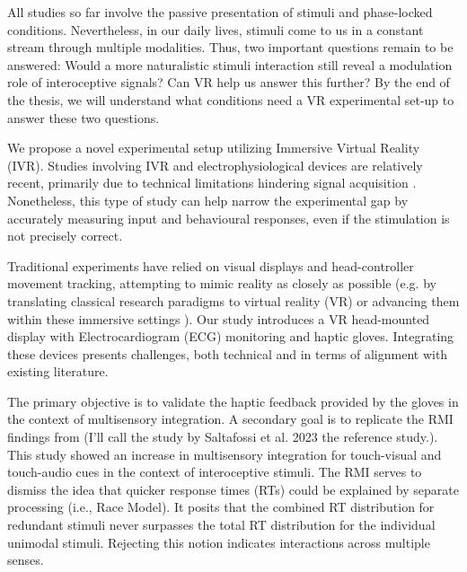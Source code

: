 \documentclass[12pt,oneside,openright]{report}
\begin{document}
All studies so far involve the passive presentation of stimuli and phase-locked conditions. Nevertheless, in our daily lives, stimuli come to us in a constant stream through multiple modalities. Thus, two important questions remain to be answered: Would a more naturalistic stimuli interaction still reveal a modulation role of interoceptive signals? Can VR help us answer this further? By the end of the thesis, we will understand what conditions need a VR experimental set-up to answer these two questions. 




We propose a novel experimental setup utilizing Immersive Virtual Reality (IVR). Studies involving IVR and electrophysiological devices are relatively recent, primarily due to technical limitations hindering signal acquisition \parencite{Klotzsche2023,Kisker2024InducedOB}. Nonetheless, this type of study can help narrow the experimental gap by accurately measuring input and behavioural responses, even if the stimulation is not precisely correct.

Traditional experiments have relied on visual displays and head-controller movement tracking, attempting to mimic reality as closely as possible (e.g. by translating classical research paradigms to virtual reality (VR) or advancing them within these immersive settings \parencite{Kisker2024InducedOB}). Our study introduces a VR head-mounted display with Electrocardiogram (ECG) monitoring and haptic gloves. Integrating these devices presents challenges, both technical and in terms of alignment with existing literature.

The primary objective is to validate the haptic feedback provided by the gloves in the context of multisensory integration. A secondary goal is to replicate the RMI findings from \textcite{SALTAFOSSI2023108642}(I'll call the study by Saltafossi et al. 2023 the reference study.). This study showed an increase in multisensory integration for touch-visual and touch-audio cues in the context of interoceptive stimuli. The RMI serves to dismiss the idea that quicker response times (RTs) could be explained by separate processing (i.e., Race Model). It posits that the combined RT distribution for redundant stimuli never surpasses the total RT distribution for the individual unimodal stimuli. Rejecting this notion indicates interactions across multiple senses.
\end{document}
